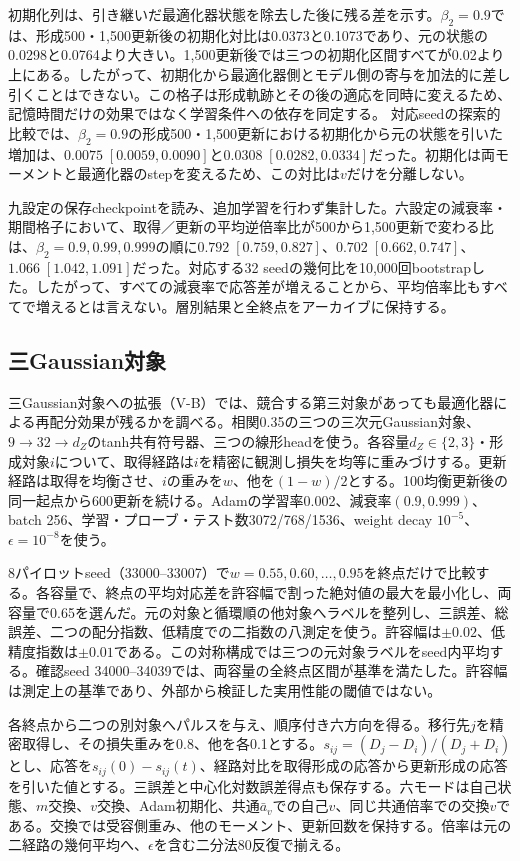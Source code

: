 初期化列は、引き継いだ最適化器状態を除去した後に残る差を示す。$\beta_2=0.9$では、形成500・1,500更新後の初期化対比は0.0373と0.1073であり、元の状態の0.0298と0.0764より大きい。1,500更新後では三つの初期化区間すべてが0.02より上にある。したがって、初期化から最適化器側とモデル側の寄与を加法的に差し引くことはできない。この格子は形成軌跡とその後の適応を同時に変えるため、記憶時間だけの効果ではなく学習条件への依存を同定する。 対応seedの探索的比較では、$\beta_2=0.9$の形成500・1,500更新における初期化から元の状態を引いた増加は、$0.0075\;[0.0059,0.0090]$と$0.0308\;[0.0282,0.0334]$だった。初期化は両モーメントと最適化器のstepを変えるため、この対比は$v$だけを分離しない。

九設定の保存checkpointを読み、追加学習を行わず集計した。六設定の減衰率・期間格子において、取得／更新の平均逆倍率比が500から1,500更新で変わる比は、$\beta_2=0.9,0.99,0.999$の順に$0.792\;[0.759,0.827]$、$0.702\;[0.662,0.747]$、$1.066\;[1.042,1.091]$だった。対応する32 seedの幾何比を10,000回bootstrapした。したがって、すべての減衰率で応答差が増えることから、平均倍率比もすべてで増えるとは言えない。層別結果と全終点をアーカイブに保持する。

\subsection{三Gaussian対象}
\label{app:threeadapt}
三Gaussian対象への拡張（V-B）では、競合する第三対象があっても最適化器による再配分効果が残るかを調べる。相関0.35の三つの三次元Gaussian対象、$9\to32\to d_Z$のtanh共有符号器、三つの線形headを使う。各容量$d_Z\in\{2,3\}$・形成対象$i$について、取得経路は$i$を精密に観測し損失を均等に重みづけする。更新経路は取得を均衡させ、$i$の重みを$w$、他を$(1-w)/2$とする。100均衡更新後の同一起点から600更新を続ける。Adamの学習率0.002、減衰率$(0.9,0.999)$、batch 256、学習・プローブ・テスト数3072/768/1536、weight decay $10^{-5}$、$\epsilon=10^{-8}$を使う。

8パイロットseed（33000--33007）で$w=0.55,0.60,\ldots,0.95$を終点だけで比較する。各容量で、終点の平均対応差を許容幅で割った絶対値の最大を最小化し、両容量で0.65を選んだ。元の対象と循環順の他対象へラベルを整列し、三誤差、総誤差、二つの配分指数、低精度での二指数の八測定を使う。許容幅は$\pm0.02$、低精度指数は$\pm0.01$である。この対称構成では三つの元対象ラベルをseed内平均する。確認seed 34000--34039では、両容量の全終点区間が基準を満たした。許容幅は測定上の基準であり、外部から検証した実用性能の閾値ではない。

各終点から二つの別対象へパルスを与え、順序付き六方向を得る。移行先$j$を精密取得し、その損失重みを0.8、他を各0.1とする。$s_{ij}=(D_j-D_i)/(D_j+D_i)$とし、応答を$s_{ij}(0)-s_{ij}(t)$、経路対比を取得形成の応答から更新形成の応答を引いた値とする。三誤差と中心化対数誤差得点も保存する。六モードは自己状態、$m$交換、$v$交換、Adam初期化、共通$\bar a_v$での自己$v$、同じ共通倍率での交換$v$である。交換では受容側重み、他のモーメント、更新回数を保持する。倍率は元の二経路の幾何平均へ、$\epsilon$を含む二分法80反復で揃える。


